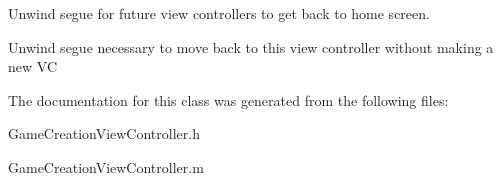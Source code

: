 Unwind segue for future view controllers to get back to home screen. 

Unwind segue necessary to move back to this view controller without making a new V\+C 

The documentation for this class was generated from the following files\+:\begin{DoxyCompactItemize}
\item 
Game\+Creation\+View\+Controller.\+h\item 
Game\+Creation\+View\+Controller.\+m\end{DoxyCompactItemize}
